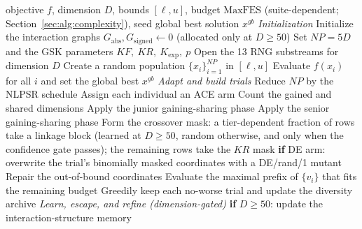 \begin{algorithm}[p]
\caption{\textbf{Pseudo-code of the DT-GSK algorithm.} The junior and senior
gaining-sharing \emph{vector-update equations} are retained unchanged; the
generation around them is not---crossover masking, tie handling, the population
size, and the senior partition are all modified. The added subsystems and their
fixed execution order are listed in Section~\ref{sec:algorithm}.}
\label{alg:dt-gsk}
\begin{algorithmic}[1]
\Require objective $f$, dimension $D$, bounds $[\ell,u]$, budget $\mathrm{MaxFES}$ (suite-dependent; Section~\ref{sec:alg:complexity}), seed
\Ensure global best solution $x^{gb}$
\Statex
\Statex \emph{Initialization}
\State Initialize the interaction graphs $G_{\mathrm{abs}}, G_{\mathrm{signed}} \gets 0$ (allocated only at $D\ge50$)
\State Set $NP{=}5D$ and the GSK parameters $KF,\ KR,\ K_{\exp},\ p$
\State Open the 13 RNG substreams for dimension $D$
\State Create a random population $\{x_i\}_{i=1}^{NP}$ in $[\ell,u]$
\State Evaluate $f(x_i)$ for all $i$ and set the global best $x^{gb}$
\Statex
{}
  \Statex
  \Statex \quad\emph{Adapt and build trials}
  \State Reduce $NP$ by the NLPSR schedule 
  \State Assign each individual an ACE arm 
  \State Count the gained and shared dimensions 
  \State Apply the junior gaining-sharing phase
  \State Apply the senior gaining-sharing phase
  \State Form the crossover mask: a tier-dependent fraction of rows take a linkage block (learned at $D{\ge}50$, random otherwise, and only when the confidence gate passes); the remaining rows take the $KR$ mask 
  \State \textbf{if} DE arm: overwrite the trial's binomially masked coordinates with a DE/rand/1 mutant 
  \State Repair the out-of-bound coordinates
  \State Evaluate the maximal prefix of $\{v_i\}$ that fits the remaining budget 
  \State Greedily keep each no-worse trial and update the diversity archive 
  \Statex
  \Statex \quad\emph{Learn, escape, and refine \textnormal{(dimension-gated)}}
  \State \textbf{if} $D{\ge}50$: update the interaction-structure memory 

\end{algorithmic}
\end{algorithm}
